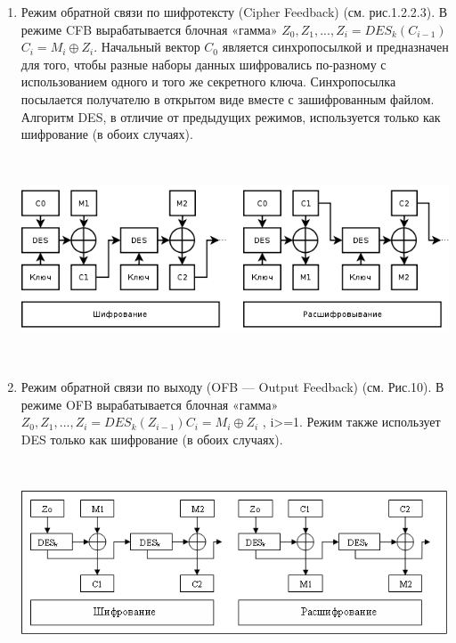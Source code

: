 \documentclass[a4paper]{report}
\begin{document}
\begin{enumerate}
~

\item Режим обратной связи по шифротексту (Cipher Feedback) (см. рис.1.2.2.3). В режиме CFB вырабатывается блочная «гамма» $Z_{0},Z_{1},...,Z_{i}=DES_{k}(C_{i-1})$ $C_{i} = M_{i}\oplus Z_{i}$. Начальный вектор $C_{0}$ является синхропосылкой и предназначен для того, чтобы разные наборы данных шифровались по-разному с использованием одного и того же секретного ключа. Синхропосылка посылается получателю в открытом виде вместе с зашифрованным файлом. Алгоритм DES, в отличие от предыдущих режимов, используется только как шифрование (в обоих случаях).

~

\includegraphics[scale=0.7]{CF}
{\\}

~

\item Режим обратной связи по выходу (OFB — Output Feedback) (см. Рис.10). В режиме OFB вырабатывается блочная «гамма» $Z_{0},Z_{1},...,Z_{i}=DES_{k}(Z_{i-1})C_{i}=M_{i}\oplus Z_{i}$ , i>=1. Режим также использует DES только как шифрование (в обоих случаях).

~

\includegraphics[scale=1.1]{OFB}
{\\}
\end{enumerate}
\end{document}
